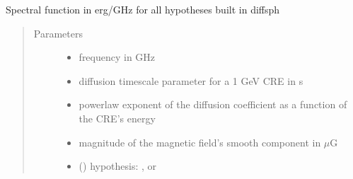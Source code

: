 \documentclass[letterpaper,10pt,english]{sphinxmanual}
\begin{document}
\begin{fulllineitems}
\label{\detokenize{diffsph.spectra:diffsph.spectra.synchrotron.X}}
\sphinxAtStartPar
Spectral function in erg/GHz for all hypotheses built in diffsph
\begin{quote}\begin{description}
\item[{Parameters}] \leavevmode\begin{itemize}
\item {} 
\sphinxAtStartPar
{} \textendash{} frequency in GHz

\item {} 
\sphinxAtStartPar
{} \textendash{} diffusion time\sphinxhyphen{}scale parameter for a 1 GeV CRE in s

\item {} 
\sphinxAtStartPar
{} \textendash{} power\sphinxhyphen{}law exponent of the diffusion coefficient as a function of the CRE’s energy

\item {} 
\sphinxAtStartPar
{} \textendash{} magnitude of the magnetic field’s smooth component in \(\mu\)G

\item {} 
\sphinxAtStartPar
{} () \textendash{} hypothesis: ,  or 

\end{itemize}

\end{description}\end{quote}

\begin{DUlineblock}{0em}
\item[] 
\end{DUlineblock}

\sphinxAtStartPar
{}


\end{fulllineitems}
\end{document}
